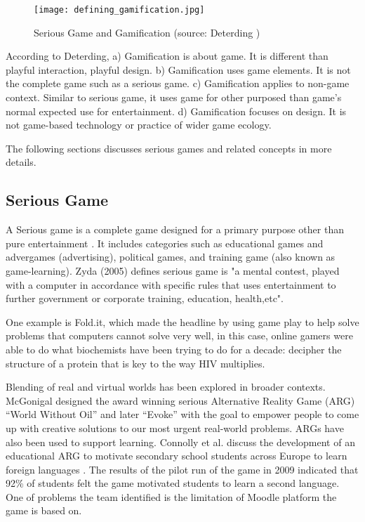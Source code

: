 \begin{figure}[htbp]
	\centering
		\texttt{[image: defining\_gamification.jpg]}
		\caption{Serious Game and Gamification (source: Deterding \cite{Deterding2011mt})}
		\label{fig:define_gamification}
\end{figure}

According to Deterding, a) Gamification is about game. It is different than playful interaction, playful design. b) Gamification uses game elements. It is not the complete game such as a serious game. c) Gamification applies to non-game context. Similar to serious game, it uses game for other purposed than game's normal expected use for entertainment. d) Gamification focuses on design. It is not game-based technology or practice of wider game ecology.

The following sections discusses serious games and related concepts in more details.

\subsection {Serious Game}
A Serious game is a complete game designed for a primary purpose other than pure entertainment \cite {WikipediaSeriousGame}. It includes categories such as educational games and advergames (advertising), political games, and training game (also known as game-learning). Zyda (2005) defines serious game is "a mental contest, played with a computer in accordance with specific rules that uses entertainment to further government or corporate training, education, health,etc".

One example is Fold.it, which made the headline \cite {khatib2011crystal} by using game play to help solve problems that computers cannot solve very well, in this case, online gamers were able to do what biochemists have been trying to do for a decade: decipher the structure of a protein that is key to the way HIV multiplies.

Blending of real and virtual worlds has been explored in broader contexts.
McGonigal designed the award winning serious Alternative Reality Game (ARG)
``World Without Oil'' \cite{worldwithoutoil} and later ``Evoke''
\cite{urgentevoke} with the goal to empower people to come up with creative
solutions to our most urgent real-world problems. ARGs have also been used to
support learning. Connolly et al. discuss the development of an educational ARG
to motivate secondary school students across Europe to learn foreign languages
\cite{connolly2009arguing}. The results of the pilot run of the game in 2009
indicated that 92\% of students felt the game motivated students to learn a
second language. One of problems the team identified is the limitation of
Moodle platform the game is based on.

